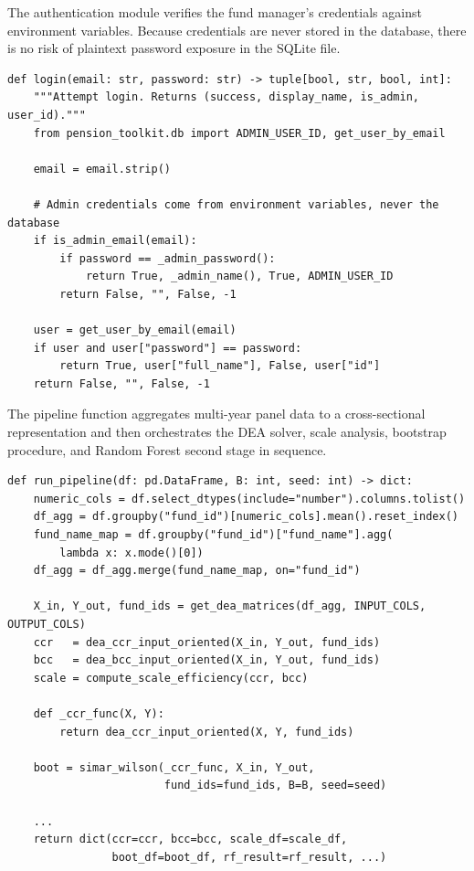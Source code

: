 \documentclass[12pt,a4paper]{report}
\begin{document}
The authentication module verifies the fund manager's credentials against environment
variables. Because credentials are never stored in the database, there is no risk of
plaintext password exposure in the SQLite file.

\begin{lstlisting}[style=pythonstyle, caption={Login credential verification --- auth.py}]
def login(email: str, password: str) -> tuple[bool, str, bool, int]:
    """Attempt login. Returns (success, display_name, is_admin, user_id)."""
    from pension_toolkit.db import ADMIN_USER_ID, get_user_by_email

    email = email.strip()

    # Admin credentials come from environment variables, never the database
    if is_admin_email(email):
        if password == _admin_password():
            return True, _admin_name(), True, ADMIN_USER_ID
        return False, "", False, -1

    user = get_user_by_email(email)
    if user and user["password"] == password:
        return True, user["full_name"], False, user["id"]
    return False, "", False, -1
\end{lstlisting}

The pipeline function aggregates multi-year panel data to a cross-sectional representation
and then orchestrates the DEA solver, scale analysis, bootstrap procedure, and Random
Forest second stage in sequence.

\begin{lstlisting}[style=pythonstyle, caption={Analysis pipeline --- ui\_streamlit.py}]
def run_pipeline(df: pd.DataFrame, B: int, seed: int) -> dict:
    numeric_cols = df.select_dtypes(include="number").columns.tolist()
    df_agg = df.groupby("fund_id")[numeric_cols].mean().reset_index()
    fund_name_map = df.groupby("fund_id")["fund_name"].agg(
        lambda x: x.mode()[0])
    df_agg = df_agg.merge(fund_name_map, on="fund_id")

    X_in, Y_out, fund_ids = get_dea_matrices(df_agg, INPUT_COLS, OUTPUT_COLS)
    ccr   = dea_ccr_input_oriented(X_in, Y_out, fund_ids)
    bcc   = dea_bcc_input_oriented(X_in, Y_out, fund_ids)
    scale = compute_scale_efficiency(ccr, bcc)

    def _ccr_func(X, Y):
        return dea_ccr_input_oriented(X, Y, fund_ids)

    boot = simar_wilson(_ccr_func, X_in, Y_out,
                        fund_ids=fund_ids, B=B, seed=seed)

    ...
    return dict(ccr=ccr, bcc=bcc, scale_df=scale_df,
                boot_df=boot_df, rf_result=rf_result, ...)
\end{lstlisting}
\end{document}
